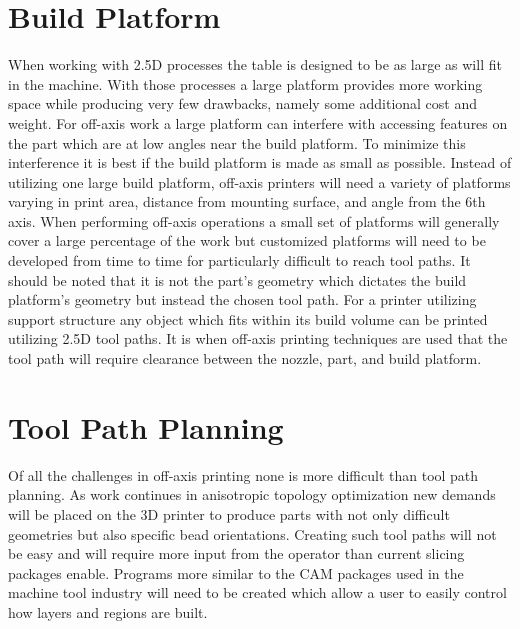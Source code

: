 \documentclass[main.tex]{subfiles}
\begin{document}
\section{Build Platform}
When working with 2.5D processes the table is designed to be as large as will fit in the machine.
With those processes a large platform provides more working space while producing very few drawbacks, namely some additional cost and weight.
For off-axis work a large platform can interfere with accessing features on the part which are at low angles near the build platform.
To minimize this interference it is best if the build platform is made as small as possible.
Instead of utilizing one large build platform, off-axis printers will need a variety of platforms varying in print area, distance from mounting surface, and angle from the 6th axis.
When performing off-axis operations a small set of platforms will generally cover a large percentage of the work but customized platforms will need to be developed from time to time for particularly difficult to reach tool paths.
It should be noted that it is not the part's geometry which dictates the build platform's geometry but instead the chosen tool path.
For a printer utilizing support structure any object which fits within its build volume can be printed utilizing 2.5D tool paths.
It is when off-axis printing techniques are used that the tool path will require clearance between the nozzle, part, and build platform.

\section{Tool Path Planning}
Of all the challenges in off-axis printing none is more difficult than tool path planning.
As work continues in anisotropic topology optimization new demands will be placed on the 3D printer to produce parts with not only difficult geometries but also specific bead orientations.
Creating such tool paths will not be easy and will require more input from the operator than current slicing packages enable.
Programs more similar to the CAM packages used in the machine tool industry will need to be created which allow a user to easily control how layers and regions are built.
\end{document}
